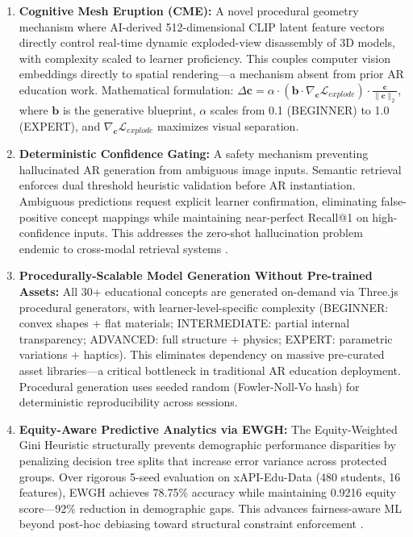 \documentclass[conference]{IEEEtran}
\begin{document}
\begin{enumerate}
    \item \textbf{Cognitive Mesh Eruption (CME):} A novel procedural geometry mechanism where AI-derived 512-dimensional CLIP latent feature vectors directly control real-time dynamic exploded-view disassembly of 3D models, with complexity scaled to learner proficiency. This couples computer vision embeddings directly to spatial rendering---a mechanism absent from prior AR education work. Mathematical formulation: $\Delta \mathbf{c} = \alpha \cdot (\mathbf{b} \cdot \nabla_{\mathbf{c}} \mathcal{L}_{explode}) \cdot \frac{\mathbf{c}}{\|\mathbf{c}\|_2}$, where $\mathbf{b}$ is the generative blueprint, $\alpha$ scales from 0.1 (BEGINNER) to 1.0 (EXPERT), and $\nabla_{\mathbf{c}} \mathcal{L}_{explode}$ maximizes visual separation.
    
    \item \textbf{Deterministic Confidence Gating:} A safety mechanism preventing hallucinated AR generation from ambiguous image inputs. Semantic retrieval enforces dual threshold heuristic validation before AR instantiation. Ambiguous predictions request explicit learner confirmation, eliminating false-positive concept mappings while maintaining near-perfect Recall@1 on high-confidence inputs. This addresses the zero-shot hallucination problem endemic to cross-modal retrieval systems \cite{liu2021clipretrieval}.
    
    \item \textbf{Procedurally-Scalable Model Generation Without Pre-trained Assets:} All 30+ educational concepts are generated on-demand via Three.js procedural generators, with learner-level-specific complexity (BEGINNER: convex shapes + flat materials; INTERMEDIATE: partial internal transparency; ADVANCED: full structure + physics; EXPERT: parametric variations + haptics). This eliminates dependency on massive pre-curated asset libraries---a critical bottleneck in traditional AR education deployment. Procedural generation uses seeded random (Fowler-Noll-Vo hash) for deterministic reproducibility across sessions.
    
    \item \textbf{Equity-Aware Predictive Analytics via EWGH:} The Equity-Weighted Gini Heuristic structurally prevents demographic performance disparities by penalizing decision tree splits that increase error variance across protected groups. Over rigorous 5-seed evaluation on xAPI-Edu-Data (480 students, 16 features), EWGH achieves 78.75\% accuracy while maintaining 0.9216 equity score---92\% reduction in demographic gaps. This advances fairness-aware ML beyond post-hoc debiasing toward structural constraint enforcement \cite{davis2023equity}.
\end{enumerate}
\end{document}
